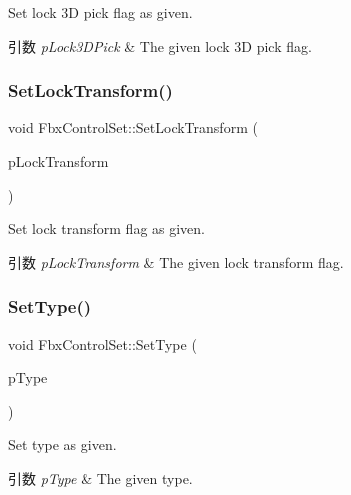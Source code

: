 Set lock 3D pick flag as given. 
\begin{DoxyParams}{引数}
{\em p\+Lock3\+D\+Pick} & The given lock 3D pick flag. \\
\hline
\end{DoxyParams}
\mbox{\label{class_fbx_control_set_aa5b0038dec7dd582522a07de65ab7229}} 
\subsubsection{\texorpdfstring{Set\+Lock\+Transform()}{SetLockTransform()}}
{\footnotesize\ttfamily void Fbx\+Control\+Set\+::\+Set\+Lock\+Transform (\begin{DoxyParamCaption}\item[{bool}]{p\+Lock\+Transform }\end{DoxyParamCaption})}

Set lock transform flag as given. 
\begin{DoxyParams}{引数}
{\em p\+Lock\+Transform} & The given lock transform flag. \\
\hline
\end{DoxyParams}
\mbox{\label{class_fbx_control_set_af7ff1a9f91a0f71629713281f5f1c9fc}} 
\subsubsection{\texorpdfstring{Set\+Type()}{SetType()}}
{\footnotesize\ttfamily void Fbx\+Control\+Set\+::\+Set\+Type (\begin{DoxyParamCaption}\item[{\hyperlink{class_fbx_control_set_a13a51702c46fff33d50c05d20f3d9f04}{E\+Type}}]{p\+Type }\end{DoxyParamCaption})}

Set type as given. 
\begin{DoxyParams}{引数}
{\em p\+Type} & The given type. \\
\hline
\end{DoxyParams}
\mbox{\label{class_fbx_control_set_add4e86e05666ef3fb9f83ae3bbc707c0}} 
